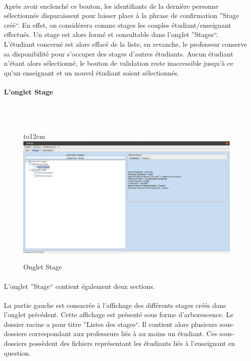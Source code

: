 \documentclass[a4paper,10pt]{report}
\begin{document}
	    \paragraph{}
	      Après avoir enclenché ce bouton, les identifiants de la dernière personne sélectionnée disparaissent pour laisser place à la phrase de confirmation ''Stage créé``.
	      En effet, on considérera comme stages les couples étudiant/enseignant effectués.
	      Un stage est alors formé et consultable dans l'onglet ''Stages``. 
	      L'étudiant concerné est alors effacé de la liste, en revanche, le professeur conserve sa disponibilité pour s'occuper des stages d'autres étudiants.
	      Aucun étudiant n'étant alors sélectionné, le bouton de validation reste inaccessible jusqu'à ce qu'un enseignant et un nouvel étudiant soient sélectionnés.
	      
	      \newpage
	  \paragraph{L'onglet Stage}
	  ~\\~\\
	      \begin{figure}[H]
		\hbox to12cm{\hss\includegraphics[width=18cm]{Stage.png}\hss}
		\caption{Onglet Stage}
	      \end{figure}
	  
	 
	      \paragraph{}
		L'onglet ''Stage`` contient également deux sections.
		
		
		
	      \paragraph{}
		La partie gauche est consacrée à l'affichage des différents stages créés dans l'onglet précédent.
		Cette affichage est présenté sous forme d'arborescence.
		Le dossier racine a pour titre ''Listes des stages``.
		Il contient alors plusieurs sous-dossiers correspondant aux professeurs liés à au moins un étudiant.
		Ces sous-dossiers possèdent des fichiers représentant les étudiants liés à l'enseignant en question.
		
\end{document}

